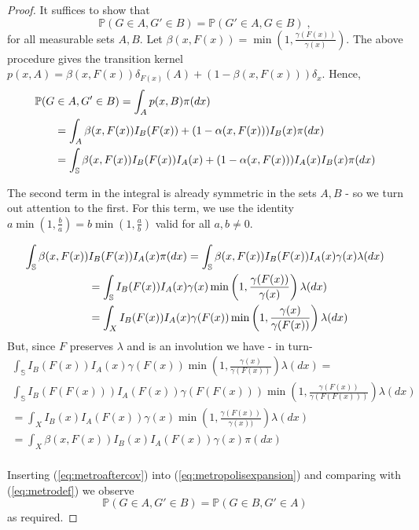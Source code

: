 \documentclass[ejs]{imsart}
\theoremstyle{plain}%
\theoremstyle{remark}
\newcommand{\prb}{\mathbb{P}}
\begin{document}
{\begin{proof}
It suffices to show that \[
\prb(G  \in A , G' \in B) =  \prb(G'  \in A , G \in B) \;, 
\] 
for all measurable sets $A,B$.
Let $\beta(x,F(x)) = \min \left(1, \frac{\gamma(F(x))}{\gamma(x)} \right)$. The above procedure gives the transition kernel $p(x, A) = \beta(x,F(x)) \delta_{F(x)}(A) + (1 - \beta(x, F(x))) \delta_{x}$. Hence,
\begin{align}
\prb(G & \in A , G' \in B) = \int_A p(x,B) \pi(dx) \notag \\
&= \int_A \beta(x, F(x)) I_B(F(x)) + (1 - \alpha(x,F(x))) I_B(x) \pi(dx) \label{eq:metrodef} \\
&= \int_\mathbb{S} \beta(x, F(x)) I_B(F(x)) I_A(x) + (1 - \alpha(x,F(x)))I_A(x)I_B(x) \pi(dx) \label{eq:metropolisexpansion}
\end{align}

The second term in the integral is already symmetric in the sets $A,B$ - so we turn out attention to the first. For this term, we use the identity $a \min(1, \frac{b}{a}) = b \min(1, \frac{a}{b})$ valid for all $a, b \ne 0$. 

\begin{align}
\int_\mathbb{S} \beta(x, F(x))& I_B(F(x)) I_A(x) \pi(dx) = \int_\mathbb{S} \beta(x, F(x)) I_B(F(x)) I_A(x) \gamma(x) \lambda(dx) \notag \\
&= \int_\mathbb{S} I_B(F(x)) I_A(x) \gamma(x) \min \left(1, \frac{\gamma(F(x))}{\gamma(x)} \right) \lambda (dx) \notag \\
&= \int_X I_B(F(x)) I_A(x) \gamma(F(x)) \min \left(1, \frac{\gamma(x)}{\gamma(F(x))} \right) \lambda (dx) \notag 
\end{align}
But, since $F$ preserves $\lambda$ and is an involution we have - in turn- 
\begin{multline}
\int_\mathbb{S} I_B(F(x)) I_A(x) \gamma(F(x)) \min \left(1, \frac{\gamma(x)}{\gamma(F(x))} \right) \lambda (dx) = \\
\int_\mathbb{S} I_B(F(F(x))) I_A(F(x)) \gamma(F(F(x))) \min \left(1, \frac{\gamma(F(x))}{\gamma(F(F(x)))} \right) \lambda (dx) \\
=\int_X I_B(x) I_A(F(x)) \gamma(x) \min \left(1, \frac{\gamma(F(x))}{\gamma(x))} \right) \lambda (dx) \\
=\int_X \beta(x, F(x)) I_B(x) I_A(F(x)) \gamma(x) \pi (dx) \\
\label{eq:metroaftercov}
\end{multline}

Inserting (\ref{eq:metroaftercov}) into (\ref{eq:metropolisexpansion}) and comparing with (\ref{eq:metrodef}) we observe 
\[\prb(G \in A , G' \in B) = \prb(G \in B , G' \in A)\]
as required.
\end{proof}

}
\end{document}
